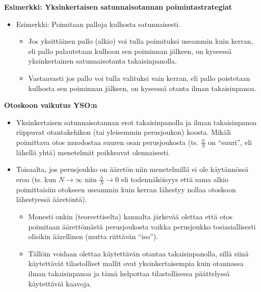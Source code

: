 \documentclass[
]{book}
\providecommand{\tightlist}{%
  \setlength{\itemsep}{0pt}\setlength{\parskip}{0pt}}
\begin{document}
\newpage

\begin{eblock}{}

\textbf{Esimerkki: Yksinkertaisen satunnaisotannan poimintastrategiat}

\begin{itemize}
\tightlist
\item
  Esimerkki: Poimitaan palloja kulhosta satunnaisesti.

  \begin{itemize}
  \tightlist
  \item
    Jos yksittäinen pallo (alkio) voi tulla poimituksi useammin kuin kerran, eli pallo palautetaan kulhoon sen poiminnan jälkeen, on kyseessä yksinkertainen satunnaisotanta takaisinpanolla.
  \item
    Vastaavasti jos pallo voi tulla valituksi vain kerran, eli pallo poistetaan kulhosta sen poiminnan jälkeen, on kyseessä otanta ilman takaisinpanoa.
  \end{itemize}
\end{itemize}

\end{eblock}

\textbf{Otoskoon vaikutus YSO:n}

\begin{itemize}
\tightlist
\item
  Yksinkertaisen satunnaisotannan erot takaisinpanolla ja ilman takaisinpanoa riippuvat otantakehikon (tai yleisemmin perusjoukon) koosta. Mikäli poimittava otos muodostaa suuren osan perusjoukosta (ts. \(\frac{n}{N}\) on ``suuri'', eli lähellä yhtä) menetelmät poikkeavat olennaisesti.
\item
  Toisaalta, jos perusjoukko on ääretön niin menetelmillä ei ole käytännössä eroa (ts. kun \(N \longrightarrow \infty\) niin \(\frac{n}{N} \longrightarrow 0\) eli todennäköisyys että sama alkio poimittaisiin otokseen useammin kuin kerran lähestyy nollaa otoskoon lähestyessä ääretöntä).

  \begin{itemize}
  \tightlist
  \item
    Monesti onkin (teoreettiselta) kannalta järkevää olettaa että otos poimitaan äärettömästä perusjoukosta vaikka perusjoukko tosiasiallisesti olisikin äärellinen (mutta riittävän ``iso'').
  \item
    Tällöin voidaan olettaa käytettävän otantaa takaisinpanolla, sillä siinä käytettävät tilastolliset mallit ovat yksinkertaisempia kuin otannassa ilman takaisinpanoa ja tämä helpottaa tilastollisessa päättelyssä käytettäviä kaavoja.
  \end{itemize}
\end{itemize}
\end{document}
